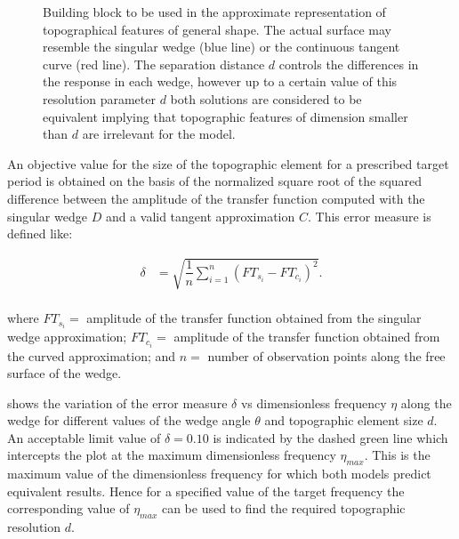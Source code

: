 \documentclass[11pt,letterpaper]{article}
\begin{document}
\begin{figure}[H]
	\centering
	\caption{\small Building block to be used in the approximate representation of topographical features of general shape. The actual surface may resemble the singular wedge (blue line) or the continuous tangent curve (red line). The separation distance $d$ controls the differences in the response in each wedge, however up to a certain value of this resolution parameter $d$ both solutions are considered to be equivalent implying that topographic features of dimension smaller than $d$ are irrelevant for the model.} 
	\label{fig:approch}
\end{figure}


An objective value for the size of the topographic element for a prescribed target period is obtained on the basis of the normalized square root of the squared difference between the amplitude of the transfer function computed with the singular wedge $D$ and a valid tangent approximation $C$. This error measure is defined like:


 \begin{equation}
 	\begin{split}
 		\delta & =  \sqrt{ \dfrac{1}{n} \sum_{i=1}^{n}(FT_{s_i} - FT_{c_i})^2}.\\
		\label{eq:quality}
 	\end{split}
 \end{equation}
 
where $FT_{s_i} =$ amplitude of the transfer function obtained from the singular wedge approximation; $FT_{c_i} =$ amplitude of the transfer function obtained from the curved approximation; and $n =$ number of observation points along the free surface of the wedge.

 shows the variation of the error measure $\delta$ vs dimensionless frequency $\eta$ along the wedge for different values of the wedge angle $\theta$ and topographic element size $d$. An acceptable limit value of $\delta = 0.10$ is indicated by the dashed green line which intercepts the plot at the maximum dimensionless frequency $\eta_{max}$. This is the maximum value of the dimensionless frequency for which both models predict equivalent results. Hence for a specified value of the target frequency the corresponding value of  $\eta_{max}$ can be used to find the required topographic resolution $d$.
\end{document}
